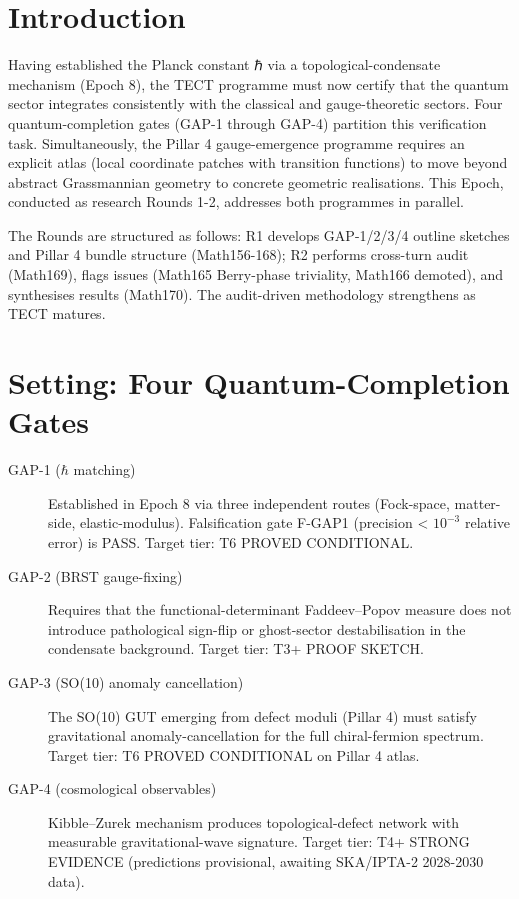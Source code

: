 \maketitle

\section{Introduction}
Having established the Planck constant ℏ via a topological-condensate mechanism
(Epoch 8), the TECT programme must now certify that the quantum sector integrates
consistently with the classical and gauge-theoretic sectors. Four quantum-completion
gates (GAP-1 through GAP-4) partition this verification task. Simultaneously,
the Pillar 4 gauge-emergence programme requires an explicit atlas (local coordinate
patches with transition functions) to move beyond abstract Grassmannian geometry
to concrete geometric realisations. This Epoch, conducted as research
Rounds 1-2, addresses both programmes in parallel.

The Rounds are structured as follows: R1 develops GAP-1/2/3/4 outline sketches
and Pillar 4 bundle structure (Math156-168); R2 performs cross-turn audit (Math169),
flags issues (Math165 Berry-phase triviality, Math166 demoted), and synthesises
results (Math170). The audit-driven methodology strengthens as TECT matures.

\section{Setting: Four Quantum-Completion Gates}
\begin{description}
\item[GAP-1 ($\hbar$ matching)] Established in Epoch 8 via three independent
  routes (Fock-space, matter-side, elastic-modulus). Falsification gate F-GAP1
  (precision < $10^{-3}$ relative error) is PASS. Target tier: T6 PROVED CONDITIONAL.
\item[GAP-2 (BRST gauge-fixing)] Requires that the functional-determinant
  Faddeev--Popov measure does not introduce pathological sign-flip or ghost-sector
  destabilisation in the condensate background. Target tier: T3+ PROOF SKETCH.
\item[GAP-3 (SO(10) anomaly cancellation)] The SO(10) GUT emerging from defect
  moduli (Pillar 4) must satisfy gravitational anomaly-cancellation for the full
  chiral-fermion spectrum. Target tier: T6 PROVED CONDITIONAL on Pillar 4 atlas.
\item[GAP-4 (cosmological observables)] Kibble--Zurek mechanism produces
  topological-defect network with measurable gravitational-wave signature.
  Target tier: T4+ STRONG EVIDENCE (predictions provisional, awaiting SKA/IPTA-2
  2028-2030 data).
\end{description}

